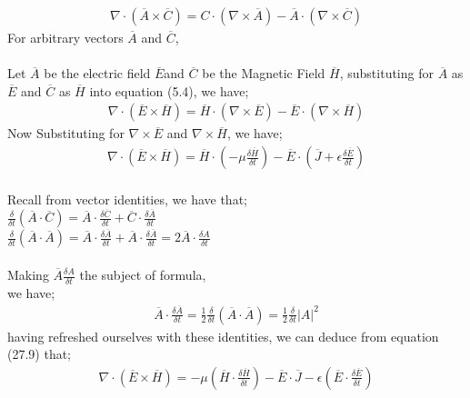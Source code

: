 \begin{align}\nabla \cdot ( \overline{A}\times\overline{C} ) = C \cdot (\nabla\times\overline{A}) - \overline{A}\cdot(\nabla\times\overline{C}) \end{align} For arbitrary vectors $\overline{A}$ and $\overline{C}$,\\\\ Let $\overline{A}$ be the electric field $\overline{E}$and $ \overline{C} $ be the Magnetic Field $\overline{H}$, substituting for $\overline{A}$ as $\overline{E}$ and $\overline{C}$ as $\overline{H}$ into equation (5.4), we have;\begin{align}
\nabla\cdot(\overline{E}\times\overline{H})= \overline{H}\cdot(\nabla\times\overline{E})-\overline{E}\cdot(\nabla\times\overline{H})\end{align} Now Substituting for $\nabla\times\overline{E}$ and $\nabla\times\overline{H}$, we have;
\begin{align} \nabla\cdot(\overline{E}\times\overline{H})=
\overline{H}\cdot(-\mu\frac{\delta\overline{H}}{\delta t}) - \overline{E}\cdot(\overline{J}+\epsilon\frac{\delta\overline{E}}{\delta t})
\end{align}\\ Recall from vector identities, we  have that;\\ $\frac{\delta}{\delta t}(\overline{A}\cdot\overline{C})= \overline{A}\cdot\frac{\delta\overline{C}}{\delta t}+\overline{C}\cdot\frac{\delta\overline{A}}{\delta t}$ \\
$\frac{\delta}{\delta t}(\overline{A}\cdot\overline{A})= \overline{A}\cdot\frac{\delta\overline{A}}{\delta t}+\overline{A}\cdot\frac{\delta\overline{A}}{\delta t} = 2\overline{A}\cdot\frac{\delta A}{\delta t}$
\\\\
Making $\overline{A}\frac{\delta A}{\delta t} $ the subject of formula,\\we have;\\ \begin{align}
\overline{A}\cdot\frac{\delta\overline{A}}{\delta t}=\frac{1}{2}\frac{\delta}{\delta t}(\overline{A}\cdot\overline{A})=\frac{1}{2}\frac{\delta}{\delta t} |A|^{2} \end{align}
having refreshed ourselves with these identities, we can deduce from equation (27.9)  that;\begin{align}
\nabla\cdot(\overline{E}\times\overline{H})=	-\mu(\overline{H}\cdot\frac{\delta\overline{H}}{\delta t})-\overline{E}\cdot\overline{J}-\epsilon(\overline{E}\cdot\frac{\delta\overline{E}}{\delta t})\end{align}
